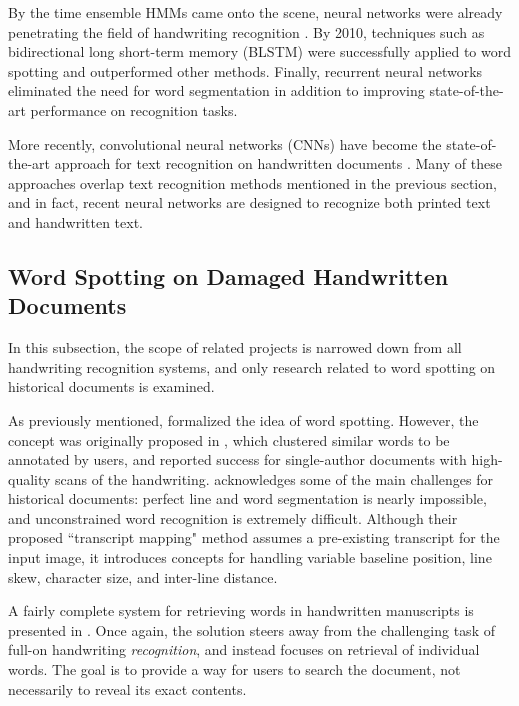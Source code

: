 \documentclass[final]{ukthesis}
\begin{document}
By the time ensemble HMMs came onto the scene, neural networks were already penetrating the field of handwriting recognition \cite{fernandez2007application}. By 2010, techniques such as bidirectional long short-term memory (BLSTM) were successfully applied to word spotting \cite{wang2010word} and outperformed other methods. Finally, recurrent neural networks \cite{frinken2012novel} eliminated the need for word segmentation in addition to improving state-of-the-art performance on recognition tasks.

More recently, convolutional neural networks (CNNs) have become the state-of-the-art approach for text recognition on handwritten documents \cite{zhong2016spottingnet,sudholt2016phocnet}. Many of these approaches overlap text recognition methods mentioned in the previous section, and in fact, recent neural networks are designed to recognize both printed text and handwritten text.


\subsection{Word Spotting on Damaged Handwritten Documents}
In this subsection, the scope of related projects is narrowed down from all handwriting recognition systems, and only research related to word spotting on historical documents is examined.

As previously mentioned, \cite{rath2007word} formalized the idea of word spotting. However, the concept was originally proposed in \cite{manmatha1996word}, which clustered similar words to be annotated by users, and reported success for single-author documents with high-quality scans of the handwriting. \cite{tomai2002transcript} acknowledges some of the main challenges for historical documents: perfect line and word segmentation is nearly impossible, and unconstrained word recognition is extremely difficult. Although their proposed ``transcript mapping" method assumes a pre-existing transcript for the input image, it introduces concepts for handling variable baseline position, line skew, character size, and inter-line distance.

A fairly complete system for retrieving words in handwritten manuscripts is presented in \cite{rath2004search}. Once again, the solution steers away from the challenging task of full-on handwriting {\em recognition}, and instead focuses on retrieval of individual words. The goal is to provide a way for users to search the document, not necessarily to reveal its exact contents.
\end{document}

